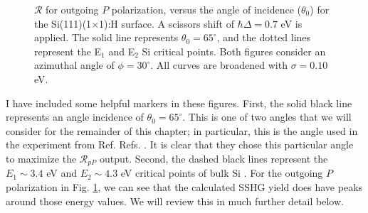 \begin{figure}[h]
\centering
{}\hfill
{}
\caption{$\mathcal{R}$ for outgoing $P$ polarization, versus the angle of
incidence ($\theta_{0}$) for the Si(111)(1$\times$1):H surface. A scissors shift
of $\hbar\Delta = 0.7$ eV is applied. The solid line represents $\theta_{0} =
65^{\circ}$, and the dotted lines represent the E$_{1}$ and E$_{2}$ Si critical
points. Both figures consider an azimuthal angle of $\phi = 30^{\circ}$. All
curves are broadened with $\sigma = 0.10$ eV.}
\label{fig:1x1rP3d}
\end{figure}

I have included some helpful markers in these figures. First, the solid black
line represents an angle incidence of $\theta_{0} = 65^{\circ}$. This is one of
two angles that we will consider for the remainder of this chapter; in
particular, this is the angle used in the experiment from Ref. Refs.
\cite{mejiaPRB02}. It is clear that they chose this particular angle to maximize
the $\mathcal{R}_{pP}$ output. Second, the dashed black lines represent the
$E_{1}\sim 3.4$ eV and $E_{2}\sim 4.3$ eV critical points of bulk Si
\cite{yubook}. For the outgoing $P$ polarization in Fig. \ref{fig:1x1rP3d}, we
can see that the calculated SSHG yield does have peaks around those energy
values. We will review this in much further detail below.

